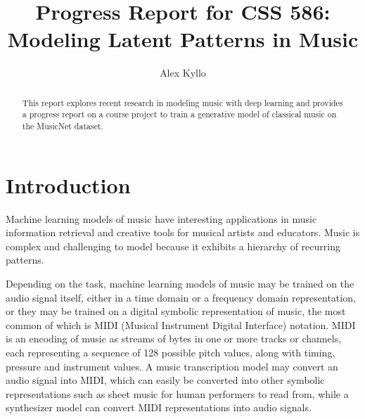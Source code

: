 \documentclass[sigconf,authorversion]{acmart}
\begin{document}
\renewcommand\footnotetextcopyrightpermission[1]{}
\pagestyle{plain}
\title{Progress Report for CSS 586: \\
Modeling Latent Patterns in Music}


\author{Alex Kyllo}

\begin{abstract}
This report explores recent research in modeling music with deep learning and
provides a progress report on a course project to train a generative model of
classical music on the MusicNet dataset.
\end{abstract}


\maketitle

\section{Introduction}

Machine learning models of music have interesting applications in music
information retrieval and creative tools for musical artists and educators.
Music is complex and challenging to model because it exhibits a hierarchy of
recurring patterns.

Depending on the task, machine learning models of music may be trained on the
audio signal itself, either in a time domain or a frequency domain
representation, or they may be trained on a digital symbolic representation of
music, the most common of which is MIDI (Musical Instrument Digital Interface)
notation. MIDI is an encoding of music as streams of bytes in one or more tracks
or channels, each representing a sequence of 128 possible pitch values, along
with timing, pressure and instrument values. A music transcription model may
convert an audio signal into MIDI, which can easily be converted into other
symbolic representations such as sheet music for human performers to read from,
while a synthesizer model can convert MIDI representations into audio signals.
\end{document}
